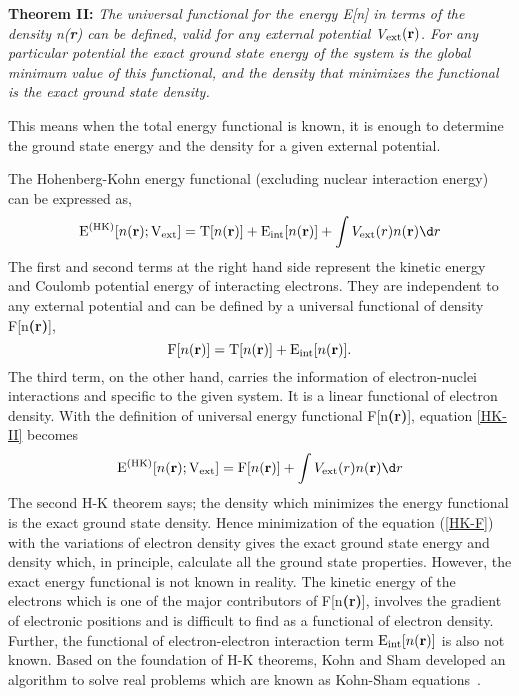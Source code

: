 {\bf Theorem II:} {\it The universal functional for the energy E[n] in terms of the density n({\bf r}) can be defined, valid for any external potential V$_{\rm ext}({\bf r})$. For any particular potential the exact ground state energy of the system is the global minimum value of this functional, and the density that minimizes the functional is the exact ground state density.}
 
This means when the total energy functional is known, it is enough to determine the ground state energy and the density for a given external potential. 

The Hohenberg-Kohn energy functional (excluding nuclear interaction energy) can be expressed as, 
\begin{equation}
{\rm E}^{({\rm HK})}[n{\bf(r)}; {\rm V}_{\rm ext}] = {\rm T}{[n({\bf r})]} + {\rm E}_{\rm int}{[n({\bf r})]}+\int V_{\rm ext}(r)n({\bf r})\d r
\label{HK-II}
\end{equation}
The first and second terms at the right hand side represent the kinetic energy and Coulomb potential energy of interacting electrons. They are independent to any external potential and can be defined by a universal functional of density F[n{\bf(r)}], 
\begin{equation}
{\rm F}[n{\bf (r)}] = {\rm T}{[n({\bf r})]} + {\rm E}_{\rm int}{[n({\bf r})]}. 
\end{equation}
The third term, on the other hand, carries the information of electron-nuclei interactions and specific to the given system. It is a linear functional of electron density. With the definition of universal energy functional F[n{\bf (r)}], equation \ref{HK-II} becomes
\begin{equation}
{\rm E}^{({\rm HK})}[n{\bf(r)}; {\rm V}_{\rm ext}]= {\rm F}{[n({\bf r})]} + \int V_{\rm ext}(r)n({\bf r})\d r
\label{HK-F}
\end{equation}
The second H-K theorem says; the density which minimizes the energy functional is the exact ground state density. Hence minimization of the equation (\ref{HK-F}) with the variations of electron density gives the exact ground state energy and density which, in principle, calculate all the ground state properties. However, the exact energy functional is not known in reality. The kinetic energy of the electrons which is one of the major contributors of F[n{\bf (r)}], involves the gradient of electronic positions and is difficult to find as a functional of electron density. Further, the functional of electron-electron interaction term ${\rm E}_{\rm int}{[n({\bf r})]}$ is also not known. Based on the foundation of H-K theorems, Kohn and Sham developed an algorithm to solve real problems which are known as Kohn-Sham equations~\citep{Kohn1965}.
